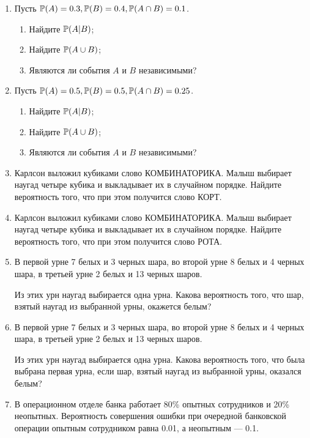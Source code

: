 \begin{enumerate}
\item  Пусть $\P(A) = 0.3, \P(B) = 0.4, \P(A\cap B) = 0.1 $.
	\begin{enumerate}
		\item  Найдите $\P(A|B)$;
		\item  Найдите $\P(A\cup B)$;
		\item  Являются ли события $A$ и $B$ независимыми?
	\end{enumerate}

\item  Пусть $\P(A) = 0.5, \P(B) = 0.5, \P(A\cap B) = 0.25 $.
\begin{enumerate}
	\item  Найдите $\P(A|B)$;
	\item  Найдите $\P(A\cup B)$;
	\item  Являются ли события $A$ и $B$ независимыми?
\end{enumerate}

\item  Карлсон выложил кубиками слово КОМБИНАТОРИКА.
Малыш выбирает наугад четыре кубика и выкладывает их в случайном порядке.
Найдите вероятность того, что при этом получится слово КОРТ.

\item  Карлсон выложил кубиками слово КОМБИНАТОРИКА.
Малыш выбирает наугад четыре кубика и выкладывает их в случайном порядке.
Найдите вероятность того, что при этом получится слово РОТА.

\item  В первой урне 7 белых и 3 черных шара, во второй урне 8 белых и 4 черных
шара, в третьей урне 2 белых и 13 черных шаров.

Из этих урн наугад выбирается одна урна.
Какова вероятность того, что шар, взятый наугад из выбранной урны, окажется белым?

\item  В первой урне 7 белых и 3 черных шара, во второй урне 8 белых и 4 черных
шара, в третьей урне 2 белых и 13 черных шаров.

Из этих урн наугад выбирается одна урна.
Какова вероятность того, что была выбрана первая урна,
если шар, взятый наугад из выбранной урны, оказался белым?

\item  В операционном отделе банка работает 80\% опытных сотрудников и 20\%
неопытных. Вероятность совершения ошибки при очередной банковской операции
опытным сотрудником равна 0.01, а неопытным — 0.1.


\end{enumerate}

